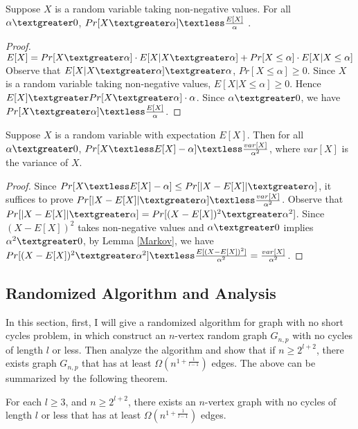 \begin{lemma}\label{Markov}
Suppose $X$ is a random variable taking non-negative values. For all $\alpha \textgreater 0$, $Pr[X\textgreater \alpha ]\textless \frac{E[X]}{\alpha}$ .
\end{lemma}
\begin{proof}
$E[X]=Pr[X\textgreater \alpha] \cdot E[X|X\textgreater \alpha ]+Pr[X\le \alpha]\cdot E[X|X \le \alpha]$\\
Observe that $E[X|X\textgreater \alpha ]\textgreater \alpha$, $Pr[X\le \alpha]\ge 0$.
Since $X$ is a random variable taking non-negative values, $E[X|X \le \alpha] \ge 0$.
Hence $E[X]\textgreater Pr[X\textgreater \alpha] \cdot \alpha $. Since $\alpha \textgreater 0$, we have $Pr[X\textgreater \alpha ]\textless \frac{E[X]}{\alpha}$.
\end{proof}
\begin{lemma}\label{Chebyshev}
Suppose $X$ is a random variable with expectation $E[X]$. Then for all $\alpha \textgreater 0$, $Pr[X\textless E[X]-\alpha] \textless \frac{var[X]}{\alpha^2}$, where $var[X]$ is the variance of $X$.
\end{lemma}
\begin{proof}
Since $Pr[X\textless E[X]-\alpha]\le Pr[|X-E[X]|\textgreater \alpha]$, it suffices to prove $Pr[|X-E[X]|\textgreater \alpha] \textless \frac{var[X]}{\alpha^2}$.
Observe that $Pr[|X-E[X]|\textgreater \alpha]=Pr[(X-E[X])^2\textgreater \alpha^2]$. Since $(X-E[X])^2$ takes non-negative values and $\alpha \textgreater 0$ implies $\alpha^2 \textgreater 0$, by Lemma \ref{Markov}, we have $Pr[(X-E[X])^2\textgreater \alpha^2]\textless \frac{E[(X-E[X])^2]}{\alpha^2}=\frac{var[X]}{\alpha^2}$.
\end{proof}
\subsection {Randomized Algorithm and Analysis}
In this section, first, I will give a randomized algorithm for graph with no short cycles problem, in which construct an $n$-vertex random graph $G_{n,p}$ with no cycles of length $l$ or less. Then analyze the algorithm and show that if $n\ge 2^{l+2}$, there exists graph $G_{n,p}$ that has at least $\Omega (n^{1+\frac{1}{l-1}})$ edges. The above can be summarized by the following theorem.
\begin{theorem}
For each $l\ge 3$, and $n\ge 2^{l+2}$, there exists an $n$-vertex graph with no cycles of length $l$ or less that has at least $\Omega (n^{1+\frac{1}{l-1}})$ edges.
\end{theorem}
